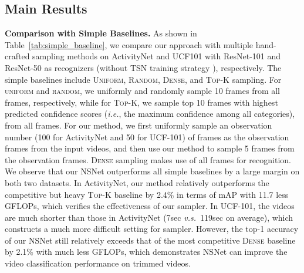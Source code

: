 \documentclass[runningheads]{llncs}
\newcommand{\tabref}[1]{Table~\ref{#1}}
\def\ie{\emph{i.e.}}
\def\vs{\emph{v.s.~}}
\begin{document}
\subsection{Main Results}
\label{main_results}
\noindent\textbf{Comparison with Simple Baselines.}
As shown in \tabref{tab:simple_baseline}, we compare our approach with multiple hand-crafted sampling methods on ActivityNet and UCF101 with ResNet-101 and ResNet-50 as recognizers (without TSN training strategy \cite{tsn}), respectively. The simple baselines include \textsc{Uniform}, \textsc{Random}, \textsc{Dense}, and \textsc{Top-K} sampling. For \textsc{uniform} and \textsc{random}, we uniformly and randomly sample 10 frames from all frames, respectively, while for \textsc{Top-K}, we sample top 10 frames with highest predicted confidence scores (\ie, the maximum confidence among all categories), from all frames. For our method, we first uniformly sample an observation number (100 for ActivityNet and 50 for UCF-101) of frames as the observation frames from the input videos, and then use our method to sample 5 frames from the observation frames. \textsc{Dense} sampling makes use of all frames for recognition. We observe that our NSNet outperforms all simple baselines by a large margin on both two datasets. In ActivityNet, our method relatively outperforms the competitive but heavy \textsc{Top-K} baseline by 2.4\% in terms of mAP with 11.7 less GFLOPs, which verifies the effectiveness of our sampler. In UCF-101, the videos are much shorter than those in ActivityNet (7sec \vs 119sec on average), which constructs a much more difficult setting for sampler. However, the top-1 accuracy of our NSNet still relatively exceeds that of the most competitive \textsc{Dense} baseline by 2.1\% with much less GFLOPs, which demonstrates NSNet can improve the video classification performance on trimmed videos. 
\end{document}
